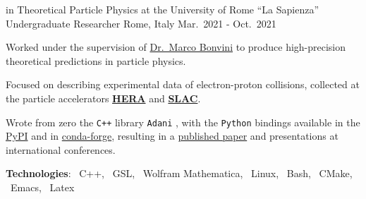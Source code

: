 \begin{cventries}
    \cventry
    {in Theoretical Particle Physics at the University of Rome ``La Sapienza''}
    {Undergraduate Researcher}
    {Rome, Italy}
    {Mar.\ 2021 - Oct.\ 2021}
    {
        \begin{cvitems} %
            \item Worked under the supervision of \href{https://inspirehep.net/authors/1058479?ui-citation-summary=true}{Dr.\ Marco Bonvini} to produce high-precision theoretical predictions in particle physics.
            \item Focused on describing experimental data of electron-proton collisions, collected at the particle accelerators \href{https://en.wikipedia.org/wiki/HERA_(particle_accelerator)}{\textbf{HERA}} and \href{https://en.wikipedia.org/wiki/SLAC_National_Accelerator_Laboratory}{\textbf{SLAC}}.
            \item Wrote from zero the \texttt{C++} library \texttt{Adani} \href{https://github.com/niclaurenti/adani}{\githublogo}, with the \texttt{Python} bindings available in the \href{https://pypi.org/project/adani/}{PyPI} and in \href{https://anaconda.org/conda-forge/adani}{conda-forge}, resulting in a \href{https://inspirehep.net/literature/3172533}{published paper} and presentations at international conferences.
            \item[] \textbf{\textcolor{awesome}{Tec}hnologies}: \cpplogo{}~C++, \gnulogo{}~GSL, \mathematicalogo{}~Wolfram Mathematica, \linuxlogo{}~Linux, \bashlogo{}~Bash, \cmakelogo{}~CMake, \emacslogo{}~Emacs, \latexlogo{}~Latex
        \end{cvitems}
    }

\end{cventries}